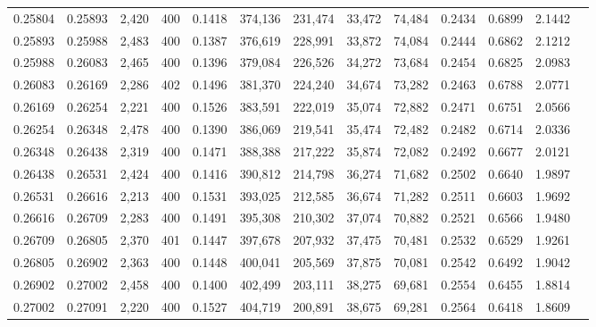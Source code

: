 \begin{tabular}{rrrrrrrrrrrrr}
0.25804 & 0.25893 &  2,420 & 400 &                                     0.1418 & 374,136 & 231,474 &  33,472 &  74,484 & 0.2434 & 0.6899 & 2.1442 \\
0.25893 & 0.25988 &  2,483 & 400 &                                     0.1387 & 376,619 & 228,991 &  33,872 &  74,084 & 0.2444 & 0.6862 & 2.1212 \\
0.25988 & 0.26083 &  2,465 & 400 &                                     0.1396 & 379,084 & 226,526 &  34,272 &  73,684 & 0.2454 & 0.6825 & 2.0983 \\
0.26083 & 0.26169 &  2,286 & 402 &                                     0.1496 & 381,370 & 224,240 &  34,674 &  73,282 & 0.2463 & 0.6788 & 2.0771 \\
0.26169 & 0.26254 &  2,221 & 400 &                                     0.1526 & 383,591 & 222,019 &  35,074 &  72,882 & 0.2471 & 0.6751 & 2.0566 \\
0.26254 & 0.26348 &  2,478 & 400 &                                     0.1390 & 386,069 & 219,541 &  35,474 &  72,482 & 0.2482 & 0.6714 & 2.0336 \\
0.26348 & 0.26438 &  2,319 & 400 &                                     0.1471 & 388,388 & 217,222 &  35,874 &  72,082 & 0.2492 & 0.6677 & 2.0121 \\
0.26438 & 0.26531 &  2,424 & 400 &                                     0.1416 & 390,812 & 214,798 &  36,274 &  71,682 & 0.2502 & 0.6640 & 1.9897 \\
0.26531 & 0.26616 &  2,213 & 400 &                                     0.1531 & 393,025 & 212,585 &  36,674 &  71,282 & 0.2511 & 0.6603 & 1.9692 \\
0.26616 & 0.26709 &  2,283 & 400 &                                     0.1491 & 395,308 & 210,302 &  37,074 &  70,882 & 0.2521 & 0.6566 & 1.9480 \\
0.26709 & 0.26805 &  2,370 & 401 &                                     0.1447 & 397,678 & 207,932 &  37,475 &  70,481 & 0.2532 & 0.6529 & 1.9261 \\
0.26805 & 0.26902 &  2,363 & 400 &                                     0.1448 & 400,041 & 205,569 &  37,875 &  70,081 & 0.2542 & 0.6492 & 1.9042 \\
0.26902 & 0.27002 &  2,458 & 400 &                                     0.1400 & 402,499 & 203,111 &  38,275 &  69,681 & 0.2554 & 0.6455 & 1.8814 \\
0.27002 & 0.27091 &  2,220 & 400 &                                     0.1527 & 404,719 & 200,891 &  38,675 &  69,281 & 0.2564 & 0.6418 & 1.8609 \\

\end{tabular}
